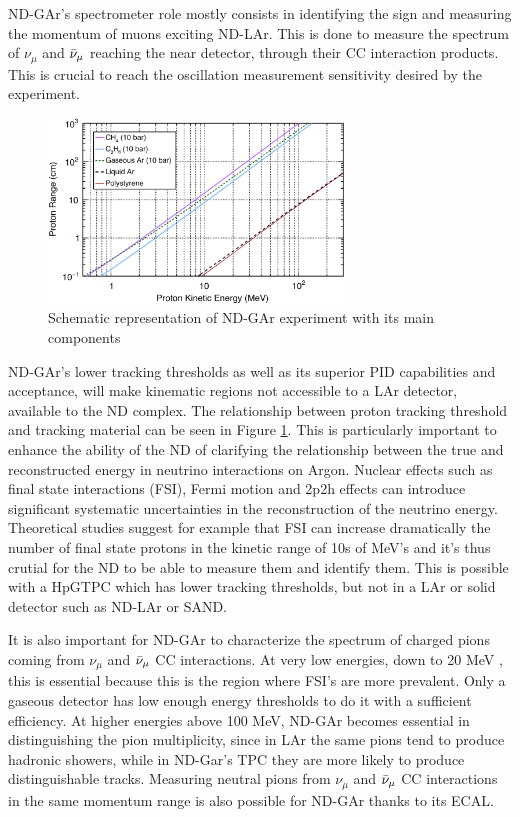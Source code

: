 ND-GAr's spectrometer role mostly consists in identifying the sign and measuring the momentum of muons exciting ND-LAr. This is done to measure the spectrum of $\nu_\mu$ and $\Bar{\nu}_\mu$ reaching the near detector, through their CC interaction products. This is crucial to reach the oscillation measurement sensitivity desired by the experiment.

\begin{figure}[t]
     \centering
     \includegraphics[width=0.7\textwidth]{figures/ch3-DUNE/threshold.png}
     \caption{Schematic representation of ND-GAr experiment with its main components}
        \label{fig:ND-G-threshold}
\end{figure}

ND-GAr's lower tracking thresholds as well as its superior PID capabilities and acceptance, will make kinematic regions not accessible to a LAr detector, available to the ND complex. The relationship between proton tracking threshold and tracking material can be seen in Figure \ref{fig:ND-G-threshold}. This is particularly important to enhance the ability of the ND of clarifying the relationship between the true and reconstructed energy in neutrino interactions on Argon. Nuclear effects such as final state interactions (FSI), Fermi motion and 2p2h effects can introduce significant systematic uncertainties in the reconstruction of the neutrino energy. Theoretical studies suggest for example that FSI can increase dramatically the number of final state protons in the kinetic range of 10s of MeV's and it's thus crutial for the ND to be able to measure them and identify them. This is possible with a HpGTPC which has lower tracking thresholds, but not in a LAr or solid detector such as ND-LAr or SAND. 

It is also important for ND-GAr to characterize the spectrum of charged pions coming from $\nu_\mu$ and $\Bar{\nu}_\mu$ CC interactions. At very low energies, down to 20 MeV , this is essential because this is the region where FSI's are more prevalent. Only a gaseous detector has low enough energy thresholds to do it with a sufficient efficiency. At higher energies above 100 MeV, ND-GAr becomes essential in distinguishing the pion multiplicity, since in LAr the same pions tend to produce hadronic showers, while in ND-Gar's TPC they are more likely to  produce distinguishable tracks. Measuring neutral pions from $\nu_\mu$ and $\Bar{\nu}_\mu$ CC interactions in the same momentum range is also possible for ND-GAr thanks to its ECAL.


